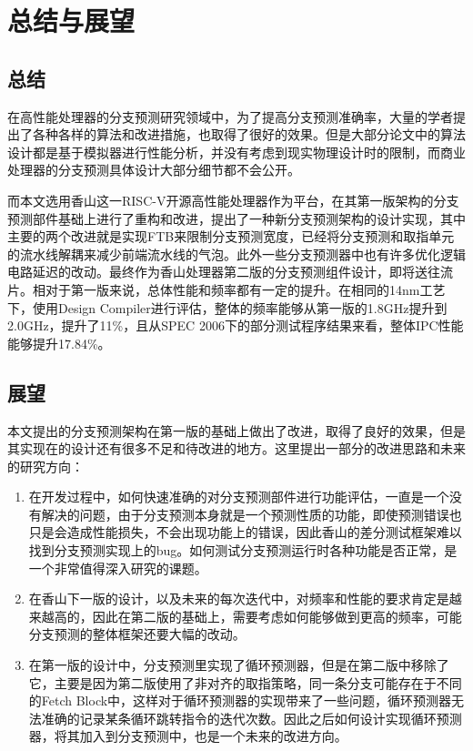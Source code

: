 
\chapter{总结与展望}

\section{总结}

在高性能处理器的分支预测研究领域中，为了提高分支预测准确率，大量的学者提出了各种各样的算法和改进措施，也取得了很好的效果。但是大部分论文中的算法设计都是基于模拟器进行性能分析，并没有考虑到现实物理设计时的限制，而商业处理器的分支预测具体设计大部分细节都不会公开。

而本文选用香山这一RISC-V开源高性能处理器作为平台，在其第一版架构的分支预测部件基础上进行了重构和改进，提出了一种新分支预测架构的设计实现，其中主要的两个改进就是实现FTB来限制分支预测宽度，已经将分支预测和取指单元的流水线解耦来减少前端流水线的气泡。此外一些分支预测器中也有许多优化逻辑电路延迟的改动。最终作为香山处理器第二版的分支预测组件设计，即将送往流片。相对于第一版来说，总体性能和频率都有一定的提升。在相同的14nm工艺下，使用Design Compiler进行评估，整体的频率能够从第一版的1.8GHz提升到2.0GHz，提升了11\%，且从SPEC 2006下的部分测试程序结果来看，整体IPC性能能够提升17.84\%。

\section{展望}

本文提出的分支预测架构在第一版的基础上做出了改进，取得了良好的效果，但是其实现在的设计还有很多不足和待改进的地方。这里提出一部分的改进思路和未来的研究方向：

\begin{enumerate}
    \item 在开发过程中，如何快速准确的对分支预测部件进行功能评估，一直是一个没有解决的问题，由于分支预测本身就是一个预测性质的功能，即使预测错误也只是会造成性能损失，不会出现功能上的错误，因此香山的差分测试框架难以找到分支预测实现上的bug。如何测试分支预测运行时各种功能是否正常，是一个非常值得深入研究的课题。
    \item 在香山下一版的设计，以及未来的每次迭代中，对频率和性能的要求肯定是越来越高的，因此在第二版的基础上，需要考虑如何能够做到更高的频率，可能分支预测的整体框架还要大幅的改动。
    \item 在第一版的设计中，分支预测里实现了循环预测器，但是在第二版中移除了它，主要是因为第二版使用了非对齐的取指策略，同一条分支可能存在于不同的Fetch Block中，这样对于循环预测器的实现带来了一些问题，循环预测器无法准确的记录某条循环跳转指令的迭代次数。因此之后如何设计实现循环预测器，将其加入到分支预测中，也是一个未来的改进方向。
\end{enumerate}

